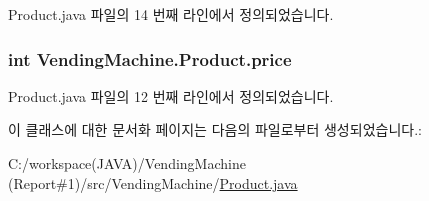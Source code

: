 Product.\+java 파일의 14 번째 라인에서 정의되었습니다.

\subsubsection[{\texorpdfstring{price}{price}}]{\setlength{\rightskip}{0pt plus 5cm}int Vending\+Machine.\+Product.\+price\hspace{0.3cm}{\ttfamily [private]}}\hypertarget{class_vending_machine_1_1_product_a5f80a5a57248015f48edb6354b6d23ed}{}\label{class_vending_machine_1_1_product_a5f80a5a57248015f48edb6354b6d23ed}


Product.\+java 파일의 12 번째 라인에서 정의되었습니다.



이 클래스에 대한 문서화 페이지는 다음의 파일로부터 생성되었습니다.\+:\begin{DoxyCompactItemize}
\item 
C\+:/workspace(\+J\+A\+V\+A)/\+Vending\+Machine (\+Report\#1)/src/\+Vending\+Machine/\hyperlink{_product_8java}{Product.\+java}\end{DoxyCompactItemize}
